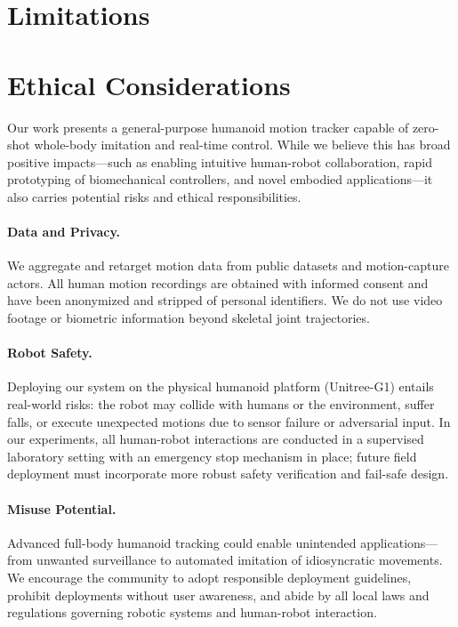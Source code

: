 \section{Limitations}
\label{sec:limitations}

\section*{Ethical Considerations}

Our work presents a general-purpose humanoid motion tracker capable of zero-shot whole-body imitation and real-time control. While we believe this has broad positive impacts—such as enabling intuitive human-robot collaboration, rapid prototyping of biomechanical controllers, and novel embodied applications—it also carries potential risks and ethical responsibilities.

\paragraph{Data and Privacy.} 
We aggregate and retarget motion data from public datasets and motion-capture actors. All human motion recordings are obtained with informed consent and have been anonymized and stripped of personal identifiers. We do not use video footage or biometric information beyond skeletal joint trajectories.

\paragraph{Robot Safety.} 
Deploying our system on the physical humanoid platform (Unitree-G1) entails real-world risks: the robot may collide with humans or the environment, suffer falls, or execute unexpected motions due to sensor failure or adversarial input. In our experiments, all human-robot interactions are conducted in a supervised laboratory setting with an emergency stop mechanism in place; future field deployment must incorporate more robust safety verification and fail-safe design.

\paragraph{Misuse Potential.} 
Advanced full-body humanoid tracking could enable unintended applications—from unwanted surveillance to automated imitation of idiosyncratic movements. We encourage the community to adopt responsible deployment guidelines, prohibit deployments without user awareness, and abide by all local laws and regulations governing robotic systems and human-robot interaction.

